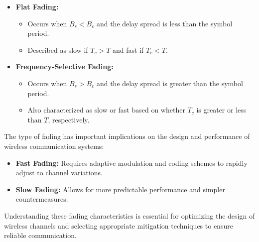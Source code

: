 \begin{itemize}
    \item \textbf{Flat Fading:}
    \begin{itemize}
        \item Occurs when \(B_s < B_c\) and the delay spread is less than the symbol period.
        \item Described as slow if \(T_c > T\) and fast if \(T_c < T\).
    \end{itemize}
    \item \textbf{Frequency-Selective Fading:}
    \begin{itemize}
        \item Occurs when \(B_s > B_c\) and the delay spread is greater than the symbol period.
        \item Also characterized as slow or fast based on whether \(T_c\) is greater or less than \(T\), respectively.
    \end{itemize}
\end{itemize}

The type of fading has important implications on the design and performance of wireless communication systems:

\begin{itemize}
    \item \textbf{Fast Fading:} Requires adaptive modulation and coding schemes to rapidly adjust to channel variations.
    \item \textbf{Slow Fading:} Allows for more predictable performance and simpler countermeasures.
\end{itemize}
Understanding these fading characteristics is essential for optimizing the design of wireless channels and selecting appropriate mitigation techniques to ensure reliable communication.



